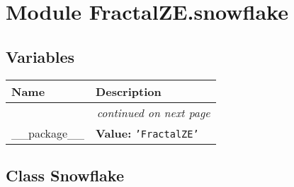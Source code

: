 %
%
%


\section{Module FractalZE.snowflake}

    \label{FractalZE:snowflake}


  \subsection{Variables}

    \vspace{-1cm}
\hspace{\varindent}\begin{longtable}{|p{\varnamewidth}|p{\vardescrwidth}|l}
\cline{1-2}
\cline{1-2} \centering \textbf{Name} & \centering \textbf{Description}& \\
\cline{1-2}
\endhead\cline{1-2}\multicolumn{3}{r}{\small\textit{continued on next page}}\\\endfoot\cline{1-2}
\endlastfoot\raggedright \_\-\_\-p\-a\-c\-k\-a\-g\-e\-\_\-\_\- & \raggedright \textbf{Value:} 
{\tt \texttt{'}\texttt{FractalZE}\texttt{'}}&\\
\cline{1-2}
\end{longtable}



\subsection{Class Snowflake}

